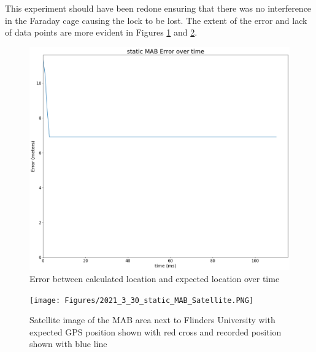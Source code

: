 This
experiment should have been redone ensuring that there was no interference in the Faraday cage causing the lock to be lost. 
The extent of the error and lack of data points are more evident in Figures \ref{fig:MABStaticError} and \ref{fig:MABSatelliteImage}.

\begin{figure}[H]
    \begin{centering}
        \includegraphics[width=14cm,keepaspectratio]{Figures/2021_3_30_static_MAB error over time.png}
        \caption{Error between calculated location and expected location over time}
        \label{fig:MABStaticError}
    \end{centering}
\end{figure}

\begin{figure}[H]
    \begin{centering}
        \texttt{[image: Figures/2021\_3\_30\_static\_MAB\_Satellite.PNG]}
        \caption{Satellite image of the MAB area next to Flinders University with expected GPS position shown with red cross and recorded position shown with blue line}
        \label{fig:MABSatelliteImage}
    \end{centering}
\end{figure}

